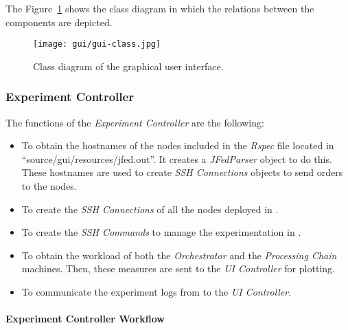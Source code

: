 The Figure~\ref{fig:gui-class} shows the class diagram in which the relations between the components are depicted.

\begin{figure}[!h]
\begin{center}
\texttt{[image: gui/gui-class.jpg]}
\caption{Class diagram of the graphical user interface.}
\label{fig:gui-class}
\end{center}
\end{figure}


\subsubsection{Experiment Controller}

The functions of the \emph{Experiment Controller} are the following:
\begin{itemize}
\item To obtain the hostnames of the \vw nodes included in the \emph{Rspec} file located in ``source/gui/resources/jfed.out''. It creates a \emph{JFedParser} object to do this. These hostnames are used to create \emph{SSH Connections} objects to send orders to the \vw nodes.
\item To create the \emph{SSH Connections} of all the nodes deployed in \vw.
\item To create the \emph{SSH Commands} to manage the experimentation in \vw.
\item To obtain the workload of both the \emph{Orchestrator} and the \emph{Processing Chain} machines. Then, these measures are sent to the \emph{UI Controller} for plotting.
\item To communicate the experiment logs from \vw to the \emph{UI Controller}.
\end{itemize}

\paragraph{Experiment Controller Workflow}~\\

